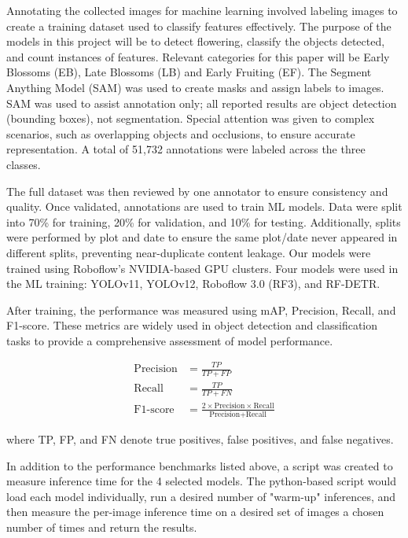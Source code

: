 Annotating the collected images for machine learning involved labeling images to create a training dataset used to classify features effectively\cite{ghosh_understanding_2019}. The purpose of the models in this project will be to detect flowering, classify the objects detected, and count instances of features. Relevant categories for this paper will be Early Blossoms (EB), Late Blossoms (LB) and Early Fruiting (EF). The Segment Anything Model (SAM)\cite{kirillov_segment_2023} was used to create masks and assign labels to images. SAM was used to assist annotation only; all reported results are object detection (bounding boxes), not segmentation. Special attention was given to complex scenarios, such as overlapping objects and occlusions, to ensure accurate representation. A total of 51,732 annotations were labeled across the three classes.

The full dataset was then reviewed by one annotator to ensure consistency and quality. Once validated, annotations are used to train ML models. Data were split into 70\% for training, 20\% for validation, and 10\% for testing. Additionally, splits were performed by plot and date to ensure the same plot/date never appeared in different splits, preventing near-duplicate content leakage. Our models were trained using Roboflow's NVIDIA-based GPU clusters\cite{dwyer_roboflow_2024}. Four models were used in the ML training: YOLOv11, YOLOv12\cite{jocher_ultralytics_2023}, Roboflow 3.0 (RF3), and RF-DETR\cite{deng_cross-domain_2024}.

After training, the performance was measured using mAP, Precision, Recall, and F1-score. These metrics are widely used in object detection and classification tasks to provide a comprehensive assessment of model performance\cite{rainio_evaluation_2024}.

\begin{align}
\text{Precision} &= \frac{TP}{TP+FP} \\[1ex]
\text{Recall} &= \frac{TP}{TP+FN} \\[1ex]
\text{F1-score} &= \frac{2 \times \text{Precision} \times \text{Recall}}{\text{Precision} + \text{Recall}}
\end{align}

where TP, FP, and FN denote true positives, false positives, and false negatives.

In addition to the performance benchmarks listed above, a script was created to measure inference time for the 4 selected models. The python-based script would load each model individually, run a desired number of "warm-up" inferences, and then measure the per-image inference time on a desired set of images a chosen number of times and return the results.


